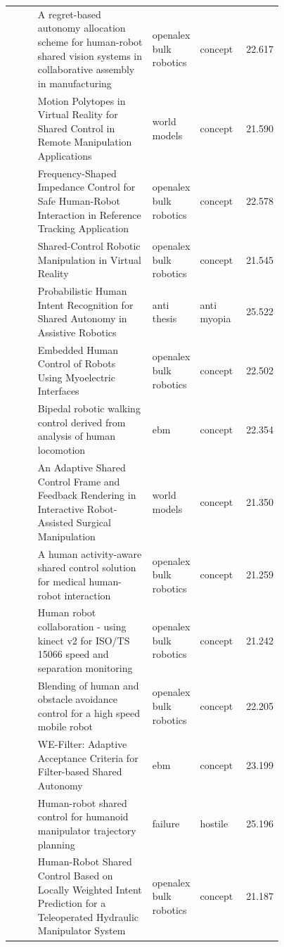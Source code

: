 \documentclass{article}
\begin{document}
\begin{center}
\begin{longtable}{@{}p{0.10\linewidth}p{0.42\linewidth}p{0.13\linewidth}p{0.12\linewidth}r@{}}
\citep{pool90_49} & A regret-based autonomy allocation scheme for human-robot shared vision systems in collaborative assembly in manufacturing & openalex bulk robotics & concept & 22.617\\
\citep{pool90_50} & Motion Polytopes in Virtual Reality for Shared Control in Remote Manipulation Applications & world models & concept & 21.590\\
\citep{pool90_51} & Frequency-Shaped Impedance Control for Safe Human-Robot Interaction in Reference Tracking Application & openalex bulk robotics & concept & 22.578\\
\citep{pool90_52} & Shared-Control Robotic Manipulation in Virtual Reality & openalex bulk robotics & concept & 21.545\\
\citep{pool90_53} & Probabilistic Human Intent Recognition for Shared Autonomy in Assistive Robotics & anti thesis & anti myopia & 25.522\\
\citep{pool90_54} & Embedded Human Control of Robots Using Myoelectric Interfaces & openalex bulk robotics & concept & 22.502\\
\citep{pool90_55} & Bipedal robotic walking control derived from analysis of human locomotion & ebm & concept & 22.354\\
\citep{pool90_56} & An Adaptive Shared Control Frame and Feedback Rendering in Interactive Robot-Assisted Surgical Manipulation & world models & concept & 21.350\\
\citep{pool90_57} & A human activity-aware shared control solution for medical human-robot interaction & openalex bulk robotics & concept & 21.259\\
\citep{pool90_58} & Human robot collaboration - using kinect v2 for ISO/TS 15066 speed and separation monitoring & openalex bulk robotics & concept & 21.242\\
\citep{pool90_59} & Blending of human and obstacle avoidance control for a high speed mobile robot & openalex bulk robotics & concept & 22.205\\
\citep{pool90_60} & WE-Filter: Adaptive Acceptance Criteria for Filter-based Shared Autonomy & ebm & concept & 23.199\\
\citep{pool90_61} & Human-robot shared control for humanoid manipulator trajectory planning & failure & hostile & 25.196\\
\citep{pool90_62} & Human-Robot Shared Control Based on Locally Weighted Intent Prediction for a Teleoperated Hydraulic Manipulator System & openalex bulk robotics & concept & 21.187\\

\end{longtable}
\end{center}
\end{document}
